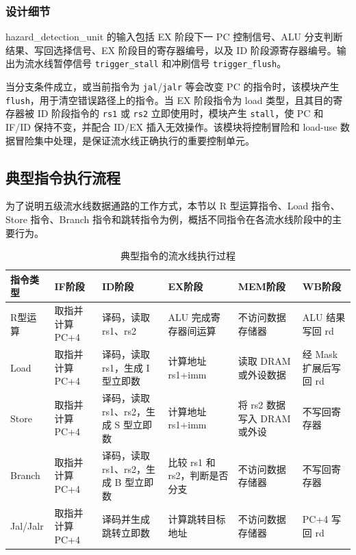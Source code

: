 \documentclass[12pt,a4paper]{ctexart}
\newcommand{\code}[1]{\texttt{#1}}
\begin{document}
\subsubsection*{设计细节}

hazard\_detection\_unit 的输入包括 EX 阶段下一 PC 控制信号、ALU 分支判断结果、写回选择信号、EX 阶段目的寄存器编号，以及 ID 阶段源寄存器编号。输出为流水线暂停信号 \code{trigger\_stall} 和冲刷信号 \code{trigger\_flush}。

当分支条件成立，或当前指令为 \code{jal}/\code{jalr} 等会改变 PC 的指令时，该模块产生 \code{flush}，用于清空错误路径上的指令。当 EX 阶段指令为 load 类型，且其目的寄存器被 ID 阶段指令的 \code{rs1} 或 \code{rs2} 立即使用时，模块产生 \code{stall}，使 PC 和 IF/ID 保持不变，并配合 ID/EX 插入无效操作。该模块将控制冒险和 load-use 数据冒险集中处理，是保证流水线正确执行的重要控制单元。


\subsection{典型指令执行流程}

为了说明五级流水线数据通路的工作方式，本节以 R 型运算指令、Load 指令、Store 指令、Branch 指令和跳转指令为例，概括不同指令在各流水线阶段中的主要行为。

\begin{table}[H]
	\centering
	\caption{典型指令的流水线执行过程}
	\footnotesize
	\setlength{\tabcolsep}{3pt}
	\renewcommand{\arraystretch}{1.2}
	\begin{tabularx}{\textwidth}{p{2cm}p{2.2cm}p{2.4cm}p{2.4cm}p{2.4cm}X}
		\toprule
		指令类型     & IF阶段       & ID阶段                    & EX阶段                & MEM阶段               & WB阶段            \\
		\midrule
		R型运算     & 取指并计算 PC+4 & 译码，读取 rs1、rs2           & ALU 完成寄存器间运算        & 不访问数据存储器            & ALU 结果写回 rd     \\
		Load     & 取指并计算 PC+4 & 译码，读取 rs1，生成 I 型立即数     & 计算地址 rs1+imm        & 读取 DRAM 或外设数据       & 经 Mask 扩展后写回 rd \\
		Store    & 取指并计算 PC+4 & 译码，读取 rs1、rs2，生成 S 型立即数 & 计算地址 rs1+imm        & 将 rs2 数据写入 DRAM 或外设 & 不写回寄存器          \\
		Branch   & 取指并计算 PC+4 & 译码，读取 rs1、rs2，生成 B 型立即数 & 比较 rs1 和 rs2，判断是否分支 & 不访问数据存储器            & 不写回寄存器          \\
		Jal/Jalr & 取指并计算 PC+4 & 译码并生成跳转立即数              & 计算跳转目标地址            & 不访问数据存储器            & PC+4 写回 rd      \\
		\bottomrule
	\end{tabularx}
\end{table}
\end{document}
